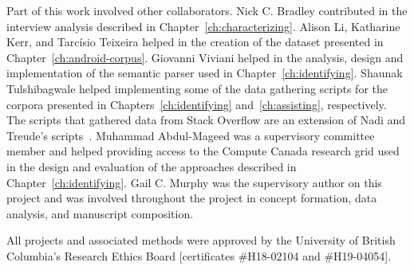 Part of this work involved other collaborators. Nick C. Bradley contributed in
the interview analysis described in Chapter~\ref{ch:characterizing}.
Alison Li, Katharine Kerr, and Tarc{\'i}sio Teixeira helped 
in the creation of the dataset presented in Chapter~\ref{ch:android-corpus}.
Giovanni Viviani helped in the analysis, design and implementation of the 
semantic parser used in Chapter~\ref{ch:identifying}.
Shaunak Tulshibagwale helped implementing some of the 
data gathering scripts for the 
corpora presented in Chapters~\ref{ch:identifying} and~\ref{ch:assisting}, respectively.
The scripts that gathered data from Stack Overflow are an extension of 
 Nadi and Treude's scripts~\cite{nadi2019Rep}.
Muhammad Abdul-Mageed was a supervisory committee member and helped providing access to the 
Compute Canada research grid used in the design and evaluation of the
approaches described in  Chapter~\ref{ch:identifying}.
Gail C. Murphy was the supervisory author on this project
and was involved throughout the project in concept formation, data analysis, and
manuscript composition.




All projects and associated methods were approved by the University of British Columbia's Research
Ethics Board [certificates \#H18-02104 and \#H19-04054].


